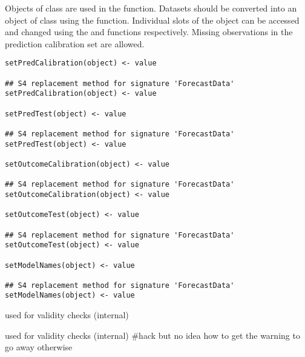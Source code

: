 \documentclass[a4paper]{book}
\begin{document}
%
\begin{Description}\relax
Objects of class  are used in the  function. Datasets should be converted into an object of class  using the  function. Individual slots of the  object can be accessed and changed using the  and  functions respectively. Missing observations in the prediction calibration set are allowed.
\end{Description}
%
\begin{Usage}
\begin{verbatim}
setPredCalibration(object) <- value

## S4 replacement method for signature 'ForecastData'
setPredCalibration(object) <- value

setPredTest(object) <- value

## S4 replacement method for signature 'ForecastData'
setPredTest(object) <- value

setOutcomeCalibration(object) <- value

## S4 replacement method for signature 'ForecastData'
setOutcomeCalibration(object) <- value

setOutcomeTest(object) <- value

## S4 replacement method for signature 'ForecastData'
setOutcomeTest(object) <- value

setModelNames(object) <- value

## S4 replacement method for signature 'ForecastData'
setModelNames(object) <- value
\end{verbatim}
\end{Usage}
%
\begin{Arguments}
\begin{ldescription}
\item[\code{object}] used for validity checks (internal)

\item[\code{value}] used for validity checks (internal) \#hack but no idea how to get the warning to go away otherwise
\end{ldescription}
\end{Arguments}
\end{document}
